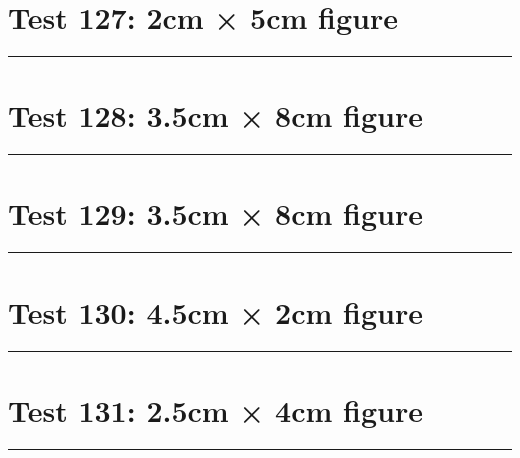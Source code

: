 \documentclass[a4paper,11pt]{article}
\begin{document}
\section*{Test 127: 2cm × 5cm figure}
\begin{swarmwrap}%
  \begin{minipage}[t]{2cm}
    \centering
    \rule{\linewidth}{5cm}
  \end{minipage}%
\end{swarmwrap}%
\swarmwrapnext
\lipsum[20]
\lipsum[21]
\lipsum[22]
\lipsum[23]
\lipsum[24]
\lipsum[25]
\section*{Test 128: 3.5cm × 8cm figure}
\begin{swarmwrap}%
  \begin{minipage}[t]{3cm}
    \centering
    \rule{\linewidth}{8cm}
  \end{minipage}%
\end{swarmwrap}%
\swarmwrapnext
\lipsum[100]
\lipsum[101]
\lipsum[102]
\lipsum[103]
\section*{Test 129: 3.5cm × 8cm figure}
\begin{swarmwrap}%
  \begin{minipage}[t]{3cm}
    \centering
    \rule{\linewidth}{8cm}
  \end{minipage}%
\end{swarmwrap}%
\swarmwrapnext
\lipsum[39]
\lipsum[40]
\lipsum[41]
\lipsum[42]
\section*{Test 130: 4.5cm × 2cm figure}
\begin{swarmwrap}%
  \begin{minipage}[t]{4cm}
    \centering
    \rule{\linewidth}{2cm}
  \end{minipage}%
\end{swarmwrap}%
\swarmwrapnext
\lipsum[110]
\lipsum[111]
\lipsum[112]
\section*{Test 131: 2.5cm × 4cm figure}
\begin{swarmwrap}%
  \begin{minipage}[t]{2cm}
    \centering
    \rule{\linewidth}{4cm}
  \end{minipage}%
\end{swarmwrap}%
\swarmwrapnext
\lipsum[14]
\lipsum[15]
\lipsum[16]
\lipsum[17]
\lipsum[18]
\lipsum[19]
\end{document}

